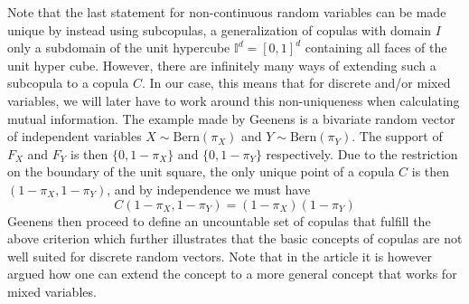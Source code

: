 \documentclass[../Thesis.tex]{subfiles}
\begin{document}
Note that the last statement for non-continuous random variables can be made unique by instead using subcopulas, a generalization of copulas with domain $I$ only a subdomain of the unit hypercube $\mathbb{I}^d = [0,1]^d$ containing all faces of the unit hyper cube. However, there are infinitely many ways of extending such a subcopula to a copula $C$\cite{Copula-modeling-for-discrete-random-vectors}. In our case, this means that for discrete and/or mixed variables, we will later have to work around this non-uniqueness when calculating mutual information. The example made by Geenens\cite{Copula-modeling-for-discrete-random-vectors} is a bivariate random vector of independent variables $X \sim \text{Bern}\left(\pi_X\right)$ and $Y\sim \text{Bern}\left(\pi_Y\right)$. The support of $F_X$ and $F_Y$ is then $\{0, 1-\pi_X\}$ and $\{0, 1-\pi_Y\}$ respectively. Due to the restriction on the boundary of the unit square, the only unique point of a copula $C$ is then $(1-\pi_X, 1-\pi_Y)$, and by independence we must have
$$C\left(1-\pi_X, 1-\pi_Y\right) = (1-\pi_X)( 1-\pi_Y)$$
Geenens then proceed to define an uncountable set of copulas that fulfill the above criterion which further illustrates that the basic concepts of copulas are not well suited for discrete random vectors. Note that in the article it is however argued how one can extend the concept to a more general concept that works for mixed variables.
\end{document}

